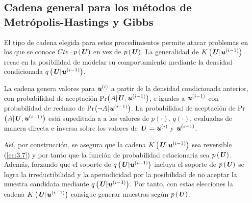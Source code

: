 \subsection{Cadena general para los métodos de Metrópolis-Hastings y Gibbs}\label{CadenaGeneral}
El tipo de cadena elegida para estos procedimientos permite atacar problemas en los que se conoce $Cte\cdot p\left(\textbf{\textit{U}}\right)$ en vez de $p\left(\textbf{\textit{U}}\right)$. La generalidad de $K\left(\textbf{\textit{U}}|\textbf{\textit{u}}^{(i-1)}\right)$ recae en la posibilidad de modelar su comportamiento mediante la densidad condicionada $q\left(\textbf{\textit{U}}|\textbf{\textit{u}}^{(i-1)}\right)$.

La cadena genera valores para $\textbf{\textit{u}}^{(i)}$ a partir de la densidad condicionada anterior, con probabilidad de aceptación Pr$\left(A|\textbf{\textit{U}}, \textbf{\textit{u}}^{(i-1)}\right)$, e iguales a $\textbf{\textit{u}}^{(i-1)}$ con probabilidad de rechazo de Pr$\left(\neg A|\textbf{\textit{u}}^{(i-1)}\right)$. La probabilidad de aceptación de Pr$\left(A|\textbf{\textit{U}}, \textbf{\textit{u}}^{(i-1)}\right)$ está supeditada a a los valores de $p(\cdot)$, $q(\cdot)$, evaluadas de manera directa e inversa sobre los valores de $\textbf{\textit{U}} = \textbf{\textit{u}}^{(i)}$ y $\textbf{\textit{u}}^{(i-1)}$.

Así, por construcción, se asegura que la cadena $K\left(\textbf{\textit{U}}|\textbf{\textit{u}}^{(i-1)}\right)$ sea reversible (\ref{ec:3.7}) y por tanto que la función de probabilidad estacionaria sea $p\left(\textbf{\textit{U}}\right)$. Además, forzando que el soporte de $q\left(\textbf{\textit{U}}|\textbf{\textit{u}}^{(i-1)}\right)$ incluya el soporte de $p\left(\textbf{\textit{U}}\right)$ se logra la irreductibilidad y la aperiodicidad por la posibilidad de no aceptar la muestra candidata mediante $q\left(\textbf{\textit{U}}|\textbf{\textit{u}}^{(i-1)}\right)$. Por tanto, con estas elecciones la cadena $K\left(\textbf{\textit{U}}|\textbf{\textit{u}}^{(i-1)}\right)$ consigue generar muestras según $p\left(\textbf{\textit{U}}\right)$.

